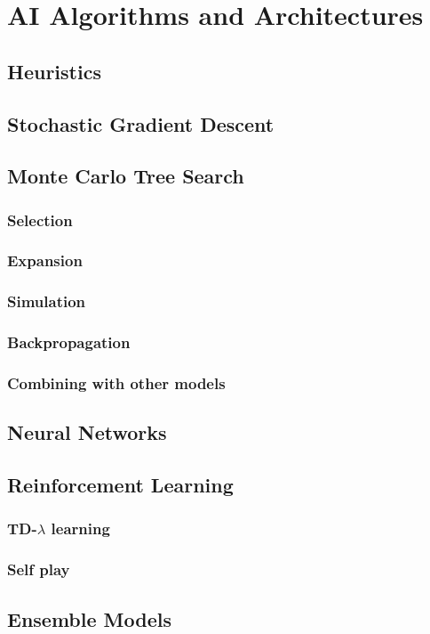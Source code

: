 \chapter{AI Algorithms and Architectures}
\section{Heuristics}
\section{Stochastic Gradient Descent}
\section{Monte Carlo Tree Search}
\subsection{Selection}
\subsection{Expansion}
\subsection{Simulation}
\subsection{Backpropagation}
\subsection{Combining with other models}
\section{Neural Networks}
\section{Reinforcement Learning}
\subsection{TD-$\lambda$ learning}
\subsection{Self play}
\section{Ensemble Models}